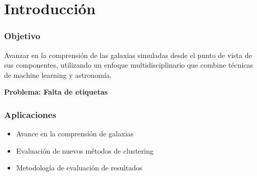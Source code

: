\section{Introducción}




\begin{frame}
\frametitle{Objetivo}

\note{
\begin{itemize}
\end{itemize}

}

Avanzar en la comprensión de las galaxias simuladas desde el punto de vista de sus componentes, utilizando un enfoque multidisciplinario que combine técnicas de machine learning y astronomía.

\pause

\vspace{2cm}

\centering \textbf{Problema: Falta de etiquetas}

\end{frame}

\iflong
\begin{frame}
\frametitle{Aplicaciones}

\begin{itemize}
    \item<1-> Avance en la comprensión de galaxias
    \item<2-> Evaluación de nuevos métodos de clustering
    \item<3-> Metodología de evaluación de resultados
\end{itemize}

\end{frame}
\fi
